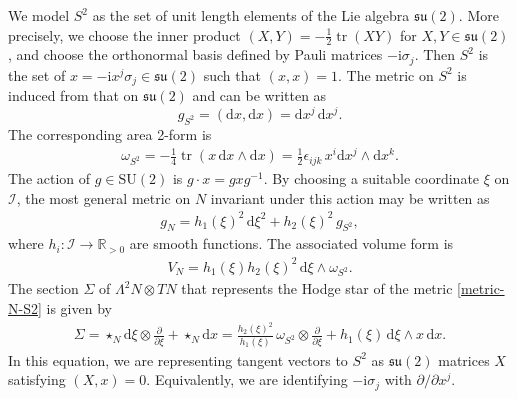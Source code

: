 \documentclass[10pt,a4paper]{amsart}
\newcommand{\II}{{\mathcal{I}}}
\newcommand{\su}{{\mathfrak{su}}}
\newcommand{\SU}{{\mathrm{SU}}}
\newcommand{\ii}{{\mathrm{i}}}
\newcommand{\R}{{\mathbb{R}}}
\newcommand{\1}{{\mathbb{1}}}
\newcommand{\bdy}{\partial}
\def \d{\mathrm{d}}
\newcommand{\tr}{{\operatorname{tr}}}
\numberwithin{equation}{section}
\begin{document}
We model $S^2$ as the set of unit length elements of the Lie algebra $\su(2)$. More precisely, we choose the inner product $(X,Y)=-\tfrac{1}{2}\tr(XY)$ for $X, Y\in\su(2)$, and choose the orthonormal basis defined by Pauli matrices $-\ii\sigma_j$. Then $S^2$ is the set of $x=-\ii x^j\sigma_j\in\su(2)$ such that $(x,x)=1$. The metric on $S^2$ is induced from that on $\su(2)$ and can be written as
\begin{equation*}
g_{S^2}=(\d x,\d x)=\d x^j\,\d x^j.
\end{equation*}
The corresponding area 2-form is
\begin{align*}
\omega_{S^2}=-\tfrac{1}{4}\tr(x\,\d x\wedge\d x)=\tfrac{1}{2}\epsilon_{ijk}\, x^i\d x^j\wedge\d x^k.
\end{align*}
The action of $g\in \SU(2)$ is $g\cdot x = gxg^{-1}$. By choosing a suitable coordinate $\xi$ on $\II$, the most general metric on $N$ invariant under this action may be written as
\begin{align}
 g_N=h_1(\xi)^2\,\d\xi^2+h_2(\xi)^2\,g_{S^2},\label{metric-N-S2}
\end{align}
where $h_i\colon \II\to\R_{>0}$ are smooth functions. The associated volume form is
\begin{align}
\label{adjoint-nu}
 V_N=h_1(\xi)h_2(\xi)^2\,\d\xi\wedge\omega_{S^2}.
\end{align}
The section $\Sigma$ of $\Lambda^2 N\otimes TN$ that represents the Hodge star of the metric \eqref{metric-N-S2} is given by
\begin{align}
\label{adjoint-Sigma}
\Sigma = \star_{N} \d \xi\otimes\frac{\bdy}{\bdy \xi} + \star_{N}\d x = \frac{h_2(\xi)^2}{h_1(\xi)}\,\omega_{S^2}\otimes\frac{\bdy}{\bdy \xi} + h_1(\xi)\,\d\xi\wedge x\, \d x.
\end{align}
In this equation, we are representing tangent vectors to $S^2$ as $\su(2)$ matrices $X$ satisfying $(X,x)=0$. Equivalently, we are identifying $-\ii\sigma_j$ with $\bdy/\bdy x^j$.
\end{document}

